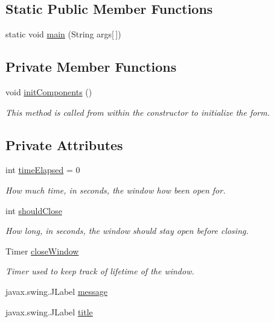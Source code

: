 \subsection*{Static Public Member Functions}
\begin{DoxyCompactItemize}
\item 
static void \hyperlink{classCommonUIElements_1_1ConfirmationWindow_a16def2d36e95c7be2b2bf3d435a4827c}{main} (String args\mbox{[}$\,$\mbox{]})
\end{DoxyCompactItemize}
\subsection*{Private Member Functions}
\begin{DoxyCompactItemize}
\item 
void \hyperlink{classCommonUIElements_1_1ConfirmationWindow_a1e0b5296df15f83d8e2fa52cc345e5a1}{init\+Components} ()
\begin{DoxyCompactList}\small\item\em This method is called from within the constructor to initialize the form. \end{DoxyCompactList}\end{DoxyCompactItemize}
\subsection*{Private Attributes}
\begin{DoxyCompactItemize}
\item 
int \hyperlink{classCommonUIElements_1_1ConfirmationWindow_a74e97a157709ec31ca3f48ff124c210c}{time\+Elapsed} = 0
\begin{DoxyCompactList}\small\item\em How much time, in seconds, the window how been open for. \end{DoxyCompactList}\item 
int \hyperlink{classCommonUIElements_1_1ConfirmationWindow_ae9ba201fcec4a227a32aa9dd18f8224f}{should\+Close}
\begin{DoxyCompactList}\small\item\em How long, in seconds, the window should stay open before closing. \end{DoxyCompactList}\item 
Timer \hyperlink{classCommonUIElements_1_1ConfirmationWindow_afaaac166e2198a99551498421b1759ff}{close\+Window}
\begin{DoxyCompactList}\small\item\em Timer used to keep track of lifetime of the window. \end{DoxyCompactList}\item 
javax.\+swing.\+J\+Label \hyperlink{classCommonUIElements_1_1ConfirmationWindow_a5161ae2950ae7a12018c207a7d0ab1d5}{message}
\item 
javax.\+swing.\+J\+Label \hyperlink{classCommonUIElements_1_1ConfirmationWindow_af03f991bc2c55d19a2507a54a20b6ab6}{title}
\end{DoxyCompactItemize}


